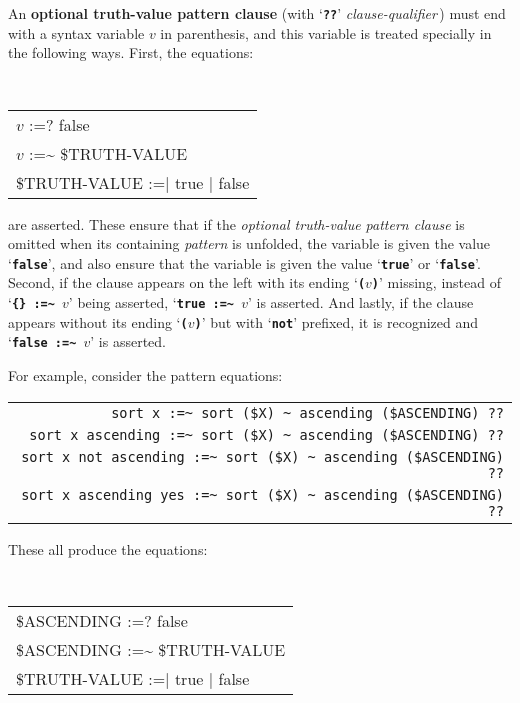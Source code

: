 \documentclass[12pt]{article}
\newcommand{\TT}[1]{{\tt \bfseries #1}}
\newcommand{\key}[1]{{\rm \bfseries #1}}
\newcommand{\TILDE}{\textasciitilde}
\begin{document}
An \key{optional truth-value pattern clause}%
%
(with `\TT{??}' {\em clause-qualifier}\,)
must end with a syntax variable $v$ in parenthesis,
and this variable is treated specially in the following ways.
First, the equations:
\begin{center}
\tt
\begin{tabular}{l}
$v$ :=? false \\
$v$ :=\TILDE{} \$TRUTH-VALUE \\
\$TRUTH-VALUE :=| true | false \\
\end{tabular}
\end{center}
are asserted.
These ensure
that if the {\em optional truth-value pattern clause} is
omitted when its containing {\em pattern} is unfolded,
the variable is given the value `\TT{false}', and also ensure that
the variable is given the value `\TT{true}' or `\TT{false}'.
Second, if the clause appears on the left with its ending `\TT{($v$)}'
missing, instead of `\TT{\{\} :=\TILDE{} $v$}' being asserted,
`\TT{true :=\TILDE{} $v$}' is asserted.  And lastly, if the clause
appears without its ending `\TT{($v$)}' but with `\TT{not}' prefixed,
it is recognized and `\TT{false :=\TILDE{} $v$}' is asserted.

For example, consider the pattern equations:

\begin{center}
\begin{tabular}{r}
\verb/sort x :=~ sort ($X) ~ ascending ($ASCENDING) ??/ \\
\verb/sort x ascending :=~ sort ($X) ~ ascending ($ASCENDING) ??/ \\
\verb/sort x not ascending :=~ sort ($X) ~ ascending ($ASCENDING) ??/ \\
\verb/sort x ascending yes :=~ sort ($X) ~ ascending ($ASCENDING) ??/ \\
\end{tabular}
\end{center}

These all produce the equations:
\begin{center}
\tt
\begin{tabular}{l}
\$ASCENDING :=? false \\
\$ASCENDING :=\TILDE{} \$TRUTH-VALUE \\
\$TRUTH-VALUE :=| true | false \\
\end{tabular}
\end{center}
\end{document}
